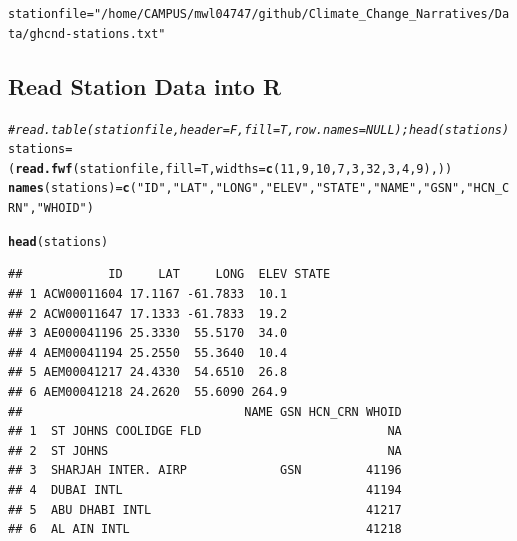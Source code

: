 \documentclass{article}\usepackage[]{graphicx}\usepackage[]{color}
\makeatletter
\newcommand{\hlnum}[1]{\textcolor[rgb]{0.686,0.059,0.569}{#1}}%
\newcommand{\hlstr}[1]{\textcolor[rgb]{0.192,0.494,0.8}{#1}}%
\newcommand{\hlcom}[1]{\textcolor[rgb]{0.678,0.584,0.686}{\textit{#1}}}%
\newcommand{\hlstd}[1]{\textcolor[rgb]{0.345,0.345,0.345}{#1}}%
\newcommand{\hlkwb}[1]{\textcolor[rgb]{0.69,0.353,0.396}{#1}}%
\newcommand{\hlkwc}[1]{\textcolor[rgb]{0.333,0.667,0.333}{#1}}%
\newcommand{\hlkwd}[1]{\textcolor[rgb]{0.737,0.353,0.396}{\textbf{#1}}}%
\newenvironment{kframe}{%
 \def\at@end@of@kframe{}%
 \ifinner\ifhmode%
  \def\at@end@of@kframe{\end{minipage}}%
  \begin{minipage}{\columnwidth}%
 \fi\fi%
 \def\FrameCommand##1{\hskip\@totalleftmargin \hskip-\fboxsep
 \colorbox{shadecolor}{##1}\hskip-\fboxsep
     \hskip-\linewidth \hskip-\@totalleftmargin \hskip\columnwidth}%
 \MakeFramed {\advance\hsize-\width
   \@totalleftmargin\z@ \linewidth\hsize
   \@setminipage}}%
 {\par\unskip\endMakeFramed%
 \at@end@of@kframe}
\newenvironment{knitrout}{}{} %
\makeatother
\begin{document}
\begin{knitrout}
\color{fgcolor}\begin{kframe}
\begin{alltt}
\hlstd{stationfile} \hlkwb{=} \hlstr{"/home/CAMPUS/mwl04747/github/Climate_Change_Narratives/Data/ghcnd-stations.txt"}
\end{alltt}
\end{kframe}
\end{knitrout}

\subsection{Read Station Data into R}

\begin{knitrout}
\color{fgcolor}\begin{kframe}
\begin{alltt}
\hlcom{# read.table(stationfile, header=F, fill=T, row.names=NULL); head(stations)}
\hlstd{stations} \hlkwb{=} \hlstd{(}\hlkwd{read.fwf}\hlstd{(stationfile,} \hlkwc{fill}\hlstd{=T,} \hlkwc{widths}\hlstd{=} \hlkwd{c}\hlstd{(}\hlnum{11}\hlstd{,} \hlnum{9}\hlstd{,} \hlnum{10}\hlstd{,} \hlnum{7}\hlstd{,} \hlnum{3}\hlstd{,} \hlnum{32}\hlstd{,} \hlnum{3}\hlstd{,} \hlnum{4}\hlstd{,} \hlnum{9}\hlstd{), ))}
\hlkwd{names}\hlstd{(stations)}\hlkwb{=} \hlkwd{c}\hlstd{(}\hlstr{"ID"}\hlstd{,} \hlstr{"LAT"}\hlstd{,} \hlstr{"LONG"}\hlstd{,} \hlstr{"ELEV"}\hlstd{,} \hlstr{"STATE"}\hlstd{,} \hlstr{"NAME"}\hlstd{,} \hlstr{"GSN"}\hlstd{,} \hlstr{"HCN_CRN"}\hlstd{,} \hlstr{"WHOID"}\hlstd{)}

\hlkwd{head}\hlstd{(stations)}
\end{alltt}
\begin{verbatim}
##            ID     LAT     LONG  ELEV STATE
## 1 ACW00011604 17.1167 -61.7833  10.1      
## 2 ACW00011647 17.1333 -61.7833  19.2      
## 3 AE000041196 25.3330  55.5170  34.0      
## 4 AEM00041194 25.2550  55.3640  10.4      
## 5 AEM00041217 24.4330  54.6510  26.8      
## 6 AEM00041218 24.2620  55.6090 264.9      
##                               NAME GSN HCN_CRN WHOID
## 1  ST JOHNS COOLIDGE FLD                          NA
## 2  ST JOHNS                                       NA
## 3  SHARJAH INTER. AIRP             GSN         41196
## 4  DUBAI INTL                                  41194
## 5  ABU DHABI INTL                              41217
## 6  AL AIN INTL                                 41218
\end{verbatim}
\end{kframe}
\end{knitrout}
\end{document}

